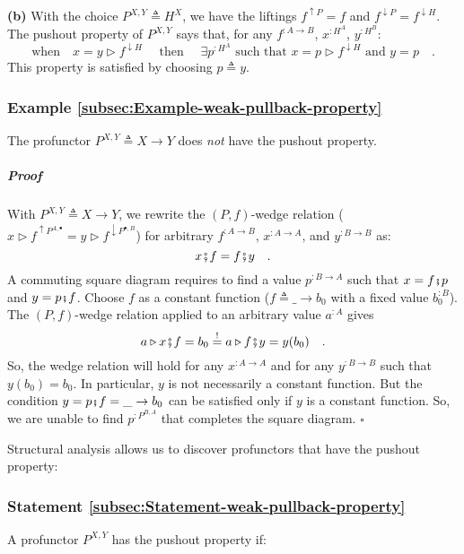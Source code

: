\textbf{(b)} With the choice $P^{X,Y}\triangleq H^{X}$, we have the
liftings $f^{\uparrow P}=f$ and $f^{\downarrow P}=f^{\downarrow H}$.
The pushout property of $P^{X,Y}$ says that, for any $f^{:A\rightarrow B}$,
$x^{:H^{A}}$, $y^{:H^{B}}$:
\[
\text{when}\quad x=y\triangleright f^{\downarrow H}\quad\text{ then }\quad\exists p^{:H^{A}}\text{ such that }x=p\triangleright f^{\downarrow H}\text{ and }y=p\quad.
\]
This property is satisfied by choosing $p\triangleq y$.

\subsubsection{Example \label{subsec:Example-weak-pullback-property}\ref{subsec:Example-weak-pullback-property}}

The profunctor $P^{X,Y}\triangleq X\rightarrow Y$ does \emph{not}
have the pushout property.

\subparagraph{Proof}

With $P^{X,Y}\triangleq X\rightarrow Y$, we rewrite the $\left(P,f\right)$-wedge
relation ($x\triangleright f^{\uparrow P^{A,\bullet}}=y\triangleright f^{\downarrow P^{\bullet,B}}$)
for arbitrary $f^{:A\rightarrow B}$, $x^{:A\rightarrow A}$, and
$y^{:B\rightarrow B}$ as:
\[
x\bef f=f\bef y\quad.
\]
A commuting square diagram requires to find a value $p^{:B\rightarrow A}$
such that $x=f\bef p$ and $y=p\bef f$. Choose $f$ as a constant
function ($f\triangleq\_\rightarrow b_{0}$ with a fixed value $b_{0}^{:B}$).
The $\left(P,f\right)$-wedge relation applied to an arbitrary value
$a^{:A}$ gives
\[
a\triangleright x\bef f=b_{0}\overset{!}{=}a\triangleright f\bef y=y(b_{0})\quad.
\]
So, the wedge relation will hold for any $x^{:A\rightarrow A}$ and
for any $y^{:B\rightarrow B}$ such that $y(b_{0})=b_{0}$. In particular,
$y$ is not necessarily a constant function. But the condition $y=p\bef f=\_\rightarrow b_{0}$
can be satisfied only if $y$ is a constant function. So, we are unable
to find $p^{:P^{B,A}}$ that completes the square diagram. $\square$

Structural analysis allows us to discover profunctors that have the
pushout property:

\subsubsection{Statement \label{subsec:Statement-weak-pullback-property}\ref{subsec:Statement-weak-pullback-property}}

A profunctor $P^{X,Y}$ has the pushout property if:

